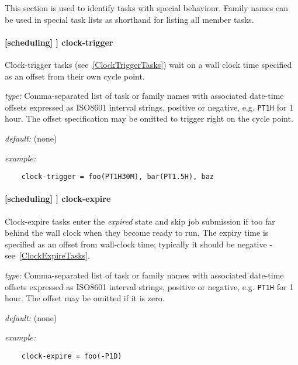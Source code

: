 This section is used to identify tasks with special behaviour. Family names can
be used in special task lists as shorthand for listing all member tasks.

\paragraph[clock-trigger]{[scheduling] \textrightarrow [[special tasks]] \textrightarrow clock-trigger}

Clock-trigger tasks (see~\ref{ClockTriggerTasks}) wait on a wall clock time
specified as an offset from their own cycle point.

\begin{myitemize}
    \item {\em type:} Comma-separated list of task or family names with
        associated date-time offsets expressed as ISO8601 interval strings,
        positive or negative, e.g. \lstinline=PT1H= for 1 hour.  The offset
        specification may be omitted to trigger right on the cycle point.
    \item {\em default:} (none)
    \item {\em example:}
\begin{lstlisting}
    clock-trigger = foo(PT1H30M), bar(PT1.5H), baz
\end{lstlisting}
\end{myitemize}

\paragraph[clock-expire]{[scheduling] \textrightarrow [[special tasks]] \textrightarrow clock-expire}
\label{ClockExpireRef}

Clock-expire tasks enter the {\em expired} state and skip job submission if too
far behind the wall clock when they become ready to run.  The expiry time is
specified as an offset from wall-clock time; typically it should be negative -
see~\ref{ClockExpireTasks}.

\begin{myitemize}
    \item {\em type:} Comma-separated list of task or family names with
        associated date-time offsets expressed as ISO8601 interval strings,
        positive or negative, e.g. \lstinline=PT1H= for 1 hour.  The offset
        may be omitted if it is zero.
    \item {\em default:} (none)
    \item {\em example:}
\begin{lstlisting}
    clock-expire = foo(-P1D)
\end{lstlisting}
\end{myitemize}

